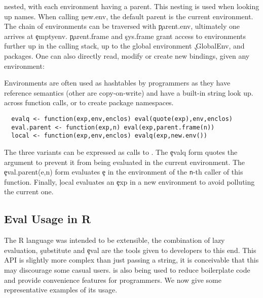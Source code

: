 \documentclass[USenglish,cleveref, autoref, thm-restate]{lipics-v2019}
\begin{document}
nested, with each environment having a parent. This nesting is used
when looking up names. When calling \c{new.env}, the default parent is
the current environment. The chain of environments can be traversed
with \c{parent.env}, ultimately one arrives at \c{emptyenv}.
\c{parent.frame} and \c{sys.frame} grant access to environments
further up in the calling stack, up to the global environment
\c{.GlobalEnv}, and packages. One can also directly read, modify or
create new bindings, given any environment:
\noindent Environments are often used as hashtables by programmers as
they have reference semantics (other are copy-on-write) and have a
built-in string look up. across function calls, or to create package
namespaces.
\begin{lstlisting}
  evalq <- function(exp,env,enclos) eval(quote(exp),env,enclos)
  eval.parent <- function(exp,n) eval(exp,parent.frame(n))
  local <- function(exp,env,enclos) evalq(exp,new.env())
\end{lstlisting}
The three \eval variants can be expressed as calls to \eval. The
\c{evalq} form quotes the argument to prevent it from being evaluated
in the current environment. The \c{eval.parent(e,n)} form evaluates
\c{e} in the environment of the {\tt n}-th caller of this function.
Finally, \c{local} evaluates an \c{exp} in a new environment to
avoid polluting the current one.

\subsection{Eval Usage in R}

The R language was intended to be extensible, the combination of lazy
evaluation, \c{substitute} and \c{eval} are the tools given to
developers to this end. This API is slightly more complex than just
passing a string, it is conceivable that this may discourage some
casual users. \Eval is also being used to reduce boilerplate code and
provide convenience features for programmers. We now give some
representative examples of its usage.
\end{document}
